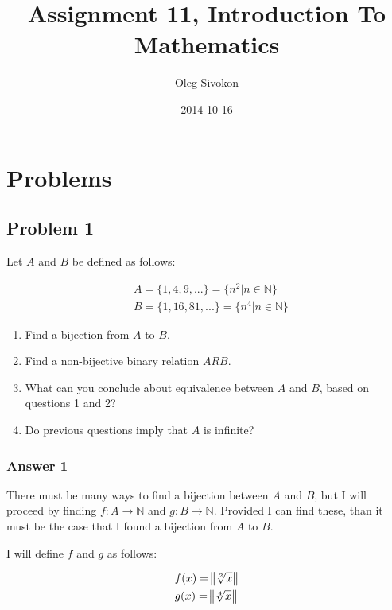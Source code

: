 \documentclass[11pt]{article}
\author{Oleg Sivokon}
\date{2014-10-16}
\title{Assignment 11, Introduction To Mathematics}
\begin{document}
\maketitle
\tableofcontents


\clearpage

\section{Problems}
\label{sec-1}

\subsection{Problem 1}
\label{sec-1-1}

Let $A$ and $B$ be defined as follows:

\begin{equation}
\begin{split}
& A = \{1, 4, 9, ...\} = \{n^2 | n \in \mathbb{N}\} \\
& B = \{1, 16, 81, ...\} = \{n^4 | n \in \mathbb{N}\}
\end{split}
\end{equation}

\begin{enumerate}
\item Find a bijection from $A$ to $B$.
\item Find a non-bijective binary relation $A R B$.
\item What can you conclude about equivalence between $A$ and $B$,
based on questions 1 and 2?
\item Do previous questions imply that $A$ is infinite?
\end{enumerate}

\subsubsection{Answer 1}
\label{sec-1-1-1}
There must be many ways to find a bijection between $A$ and $B$,
but I will proceed by finding $f:A \rightarrow \mathbb{N}$ and
$g:B \rightarrow \mathbb{N}$.  Provided I can find these, than it
must be the case that I found a bijection from $A$ to $B$.

I will define $f$ and $g$ as follows:

\begin{equation}
\begin{split}
& f(x) = \norm{\sqrt[2]{x}} \\
& g(x) = \norm{\sqrt[4]{x}}
\end{split}
\end{equation}
\end{document}
